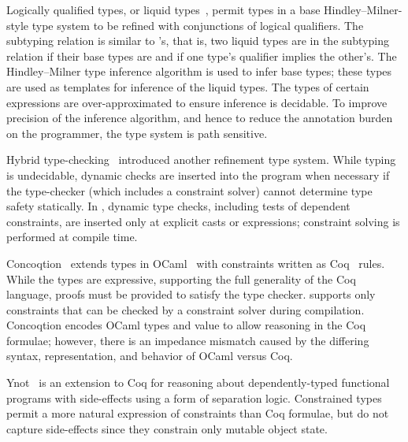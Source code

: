 

Logically qualified types, or liquid types~\cite{liquid-types},
permit types in a base Hindley--Milner-style type system to be refined with
conjunctions of logical qualifiers.  The subtyping relation is similar to
\Xten{}'s, that is, two liquid types are in the subtyping relation if their base
types are and if one type's qualifier implies the other's.
The Hindley--Milner type
inference algorithm is used to infer base types; these types are used as templates for inference of the liquid types.
The types of certain expressions are over-approximated to ensure inference
is decidable.
To improve precision of the inference algorithm, and hence
to reduce the annotation burden on the programmer, 
the type system is path sensitive.

Hybrid type-checking~\cite{flanagan-popl06,flanagan-fool06}
introduced another refinement type system.
While typing is undecidable, dynamic checks are inserted into
the program when necessary if the type-checker (which
includes a constraint solver) cannot determine
type safety statically.
In \FXG{}, dynamic type checks, including tests of dependent
constraints, are inserted only at explicit casts or
 expressions; constraint solving is performed at compile time.


Concoqtion~\cite{concoqtion} extends types in OCaml~\cite{ocaml}
with constraints written as Coq~\cite{coq} rules.
While the types are expressive, supporting the full generality
of the Coq language, proofs must be
provided to satisfy the type checker.
\Xten{} supports only constraints that can be checked by a
constraint solver during compilation.
Concoqtion encodes OCaml types and value to allow reasoning in
the Coq formulae; however, there is an impedance mismatch
caused by the differing syntax, representation, and behavior
of OCaml versus Coq.

Ynot~\cite{ynot} is an extension to Coq for reasoning about 
dependently-typed functional programs with side-effects using a
form of separation logic.
Constrained types permit a more natural expression of constraints
than Coq formulae, but do not capture side-effects since they constrain
only mutable object state.

